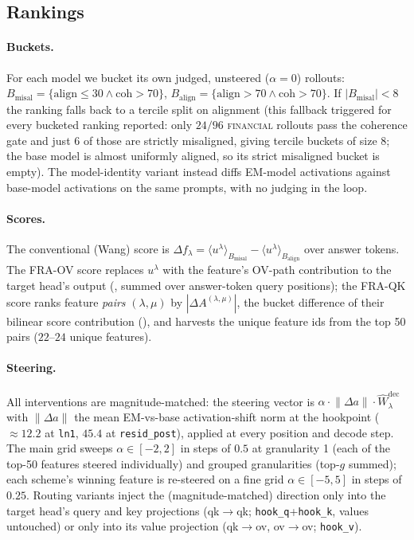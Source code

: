 \documentclass{article}
\theoremstyle{plain}
\theoremstyle{definition}
\theoremstyle{remark}
\begin{document}
\subsection{Rankings}
\paragraph{Buckets.} For each model we bucket its own judged, unsteered ($\alpha{=}0$) rollouts: $B_{\text{misal}} = \{\text{align} \le 30 \wedge \text{coh} > 70\}$, $B_{\text{align}} = \{\text{align} > 70 \wedge \text{coh} > 70\}$. If $|B_{\text{misal}}| < 8$ the ranking falls back to a tercile split on alignment (this fallback triggered for every bucketed ranking reported: only $24/96$ \textsc{financial} rollouts pass the coherence gate and just $6$ of those are strictly misaligned, giving tercile buckets of size $8$; the base model is almost uniformly aligned, so its strict misaligned bucket is empty). The model-identity variant instead diffs EM-model activations against base-model activations on the same prompts, with no judging in the loop.

\paragraph{Scores.} The conventional (Wang) score is $\Delta f_\lambda = \langle u^\lambda \rangle_{B_{\text{misal}}} - \langle u^\lambda \rangle_{B_{\text{align}}}$ over answer tokens. The FRA-OV score replaces $u^\lambda$ with the feature's OV-path contribution to the target head's output (, summed over answer-token query positions); the FRA-QK score ranks feature \emph{pairs} $(\lambda, \mu)$ by $|\Delta A^{(\lambda,\mu)}|$, the bucket difference of their bilinear score contribution (), and harvests the unique feature ids from the top 50 pairs ($22$--$24$ unique features).

\paragraph{Steering.} All interventions are magnitude-matched: the steering vector is $\alpha \cdot \lVert \Delta a \rVert \cdot \widehat{W}^{\mathrm{dec}}_\lambda$ with $\lVert \Delta a \rVert$ the mean EM-vs-base activation-shift norm at the hookpoint ($\approx 12.2$ at \texttt{ln1}, $45.4$ at \texttt{resid\_post}), applied at every position and decode step. The main grid sweeps $\alpha \in [-2, 2]$ in steps of $0.5$ at granularity 1 (each of the top-50 features steered individually) and grouped granularities (top-$g$ summed); each scheme's winning feature is re-steered on a fine grid $\alpha \in [-5, 5]$ in steps of $0.25$. Routing variants inject the (magnitude-matched) direction only into the target head's query and key projections (qk$\to$qk; \texttt{hook\_q}+\texttt{hook\_k}, values untouched) or only into its value projection (qk$\to$ov, ov$\to$ov; \texttt{hook\_v}).
\end{document}
